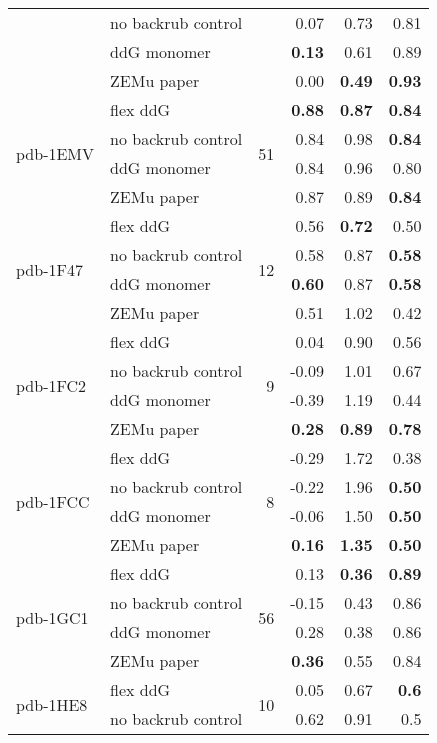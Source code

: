 {\begin{longtable}{llrrrr}
 & no backrub control & & 0.07 & 0.73 & 0.81  \\
 & ddG monomer & & \textbf{0.13} & 0.61 & 0.89  \\
 & ZEMu paper & & 0.00 & \textbf{0.49} & \textbf{0.93}  \\
\hline
 \multirow{ 4}{*}{pdb-1EMV} & flex ddG & \multirow{ 4}{*}{51} & \textbf{0.88} & \textbf{0.87} & \textbf{0.84}  \\
 & no backrub control & & 0.84 & 0.98 & \textbf{0.84}  \\
 & ddG monomer & & 0.84 & 0.96 & 0.80  \\
 & ZEMu paper & & 0.87 & 0.89 & \textbf{0.84}  \\
\hline
 \multirow{ 4}{*}{pdb-1F47} & flex ddG & \multirow{ 4}{*}{12} & 0.56 & \textbf{0.72} & 0.50  \\
 & no backrub control & & 0.58 & 0.87 & \textbf{0.58}  \\
 & ddG monomer & & \textbf{0.60} & 0.87 & \textbf{0.58}  \\
 & ZEMu paper & & 0.51 & 1.02 & 0.42  \\
\hline
 \multirow{ 4}{*}{pdb-1FC2} & flex ddG & \multirow{ 4}{*}{9} & 0.04 & 0.90 & 0.56  \\
 & no backrub control & & -0.09 & 1.01 & 0.67  \\
 & ddG monomer & & -0.39 & 1.19 & 0.44  \\
 & ZEMu paper & & \textbf{0.28} & \textbf{0.89} & \textbf{0.78}  \\
\hline
 \multirow{ 4}{*}{pdb-1FCC} & flex ddG & \multirow{ 4}{*}{8} & -0.29 & 1.72 & 0.38  \\
 & no backrub control & & -0.22 & 1.96 & \textbf{0.50}  \\
 & ddG monomer & & -0.06 & 1.50 & \textbf{0.50}  \\
 & ZEMu paper & & \textbf{0.16} & \textbf{1.35} & \textbf{0.50}  \\
\hline
 \multirow{ 4}{*}{pdb-1GC1} & flex ddG & \multirow{ 4}{*}{56} & 0.13 & \textbf{0.36} & \textbf{0.89}  \\
 & no backrub control & & -0.15 & 0.43 & 0.86  \\
 & ddG monomer & & 0.28 & 0.38 & 0.86  \\
 & ZEMu paper & & \textbf{0.36} & 0.55 & 0.84  \\
\hline
 \multirow{ 4}{*}{pdb-1HE8} & flex ddG & \multirow{ 4}{*}{10} & 0.05 & 0.67 & \textbf{0.6}  \\
 & no backrub control & & 0.62 & 0.91 & 0.5  \\

\end{longtable}}
